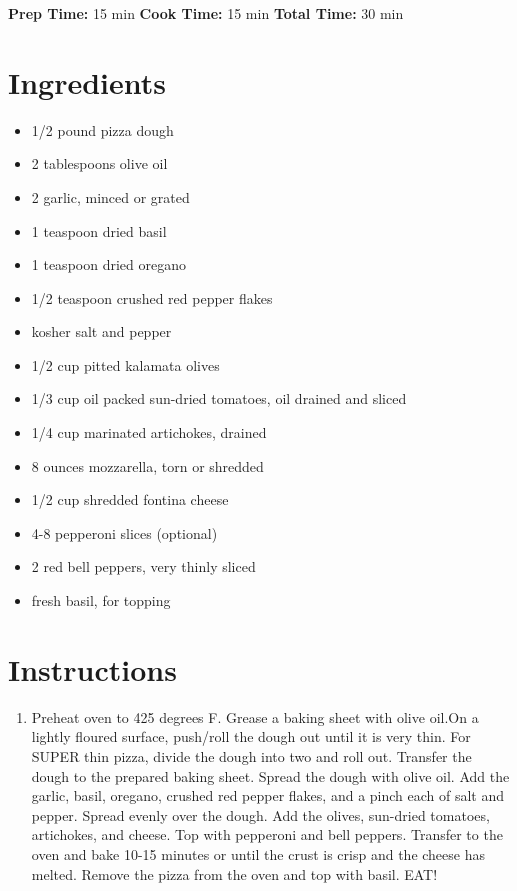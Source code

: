 \documentclass[
  letterpaper,
  DIV=11,
  numbers=noendperiod,
  titlepage=false]{scrreprt}
\providecommand{\tightlist}{%
  \setlength{\itemsep}{0pt}\setlength{\parskip}{0pt}}\usepackage{longtable,booktabs,array}
\begin{document}
\textbf{Prep Time:} 15 min \textbar{} \textbf{Cook Time:} 15 min
\textbar{} \textbf{Total Time:} 30 min

\section{Ingredients}\label{ingredients-137}

\begin{itemize}
\tightlist
\item
  1/2 pound pizza dough
\item
  2 tablespoons olive oil
\item
  2 garlic, minced or grated
\item
  1 teaspoon dried basil
\item
  1 teaspoon dried oregano
\item
  1/2 teaspoon crushed red pepper flakes
\item
  kosher salt and pepper
\item
  1/2 cup pitted kalamata olives
\item
  1/3 cup oil packed sun-dried tomatoes, oil drained and sliced
\item
  1/4 cup marinated artichokes, drained
\item
  8 ounces mozzarella, torn or shredded
\item
  1/2 cup shredded fontina cheese
\item
  4-8 pepperoni slices (optional)
\item
  2 red bell peppers, very thinly sliced
\item
  fresh basil, for topping
\end{itemize}

\section{Instructions}\label{instructions-137}

\begin{enumerate}
\def\labelenumi{\arabic{enumi}.}
\tightlist
\item
  Preheat oven to 425 degrees F. Grease a baking sheet with olive oil.On
  a lightly floured surface, push/roll the dough out until it is very
  thin. For SUPER thin pizza, divide the dough into two and roll out.
  Transfer the dough to the prepared baking sheet. Spread the dough with
  olive oil. Add the garlic, basil, oregano, crushed red pepper flakes,
  and a pinch each of salt and pepper. Spread evenly over the dough. Add
  the olives, sun-dried tomatoes, artichokes, and cheese. Top with
  pepperoni and bell peppers. Transfer to the oven and bake 10-15
  minutes or until the crust is crisp and the cheese has melted. Remove
  the pizza from the oven and top with basil. EAT!
\end{enumerate}
\end{document}

